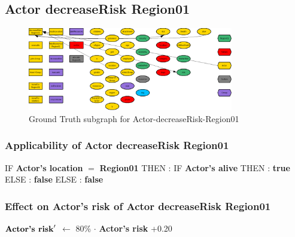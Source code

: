 \documentclass{article}%
\begin{document}
%
\subsection{Actor decreaseRisk Region01}%
\label{subsec:Actor decreaseRisk Region01}%


\begin{figure}[ht]%
\centering%
\includegraphics[width=0.8\textwidth]{images/Actor-decreaseRisk-Region01.png}%
\caption{Ground Truth subgraph for Actor{-}decreaseRisk{-}Region01}%
\end{figure}

%
\subsubsection{Applicability of Actor decreaseRisk Region01}%
\label{ssubsec:Applicability of Actor decreaseRisk Region01}%
\begin{flushleft}%
IF %
\textbf{Actor's location}%
$=$%
\textbf{Region01}%
\linebreak%
\hspace*{2em}%
THEN %
: %
IF %
\textbf{Actor's alive}%
\linebreak%
\hspace*{4em}%
THEN %
: %
\textbf{true}%
\linebreak%
\hspace*{4em}%
ELSE %
: %
\textbf{false}%
\linebreak%
\hspace*{2em}%
ELSE %
: %
\textbf{false}%
\end{flushleft}

%
\subsubsection{Effect on Actor's risk of Actor decreaseRisk Region01}%
\label{ssubsec:Effect on Actor's risk of Actor decreaseRisk Region01}%
\begin{flushleft}%
$\mbox{\textbf{Actor's risk}} '$%
$\leftarrow$%
80\%%
$\cdot$%
\textbf{Actor's risk}%
+0.20%
\end{flushleft}
\end{document}
